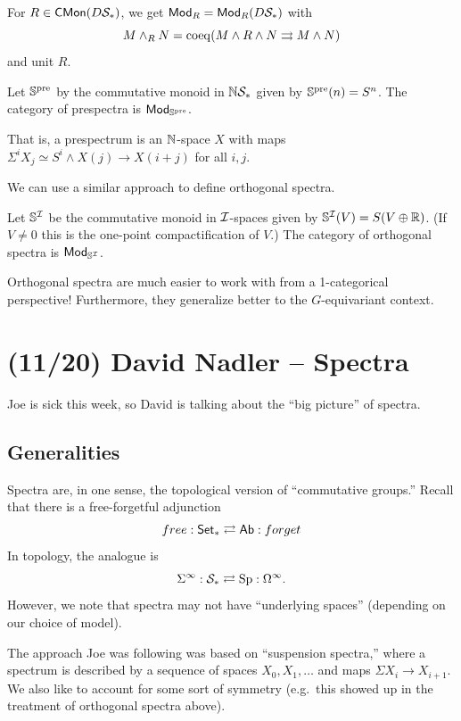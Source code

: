 \documentclass{article}
\begin{document}
For $R \in \mathsf{CMon}(D\mathcal{S}_*)$, we get $\mathsf{Mod}_R = \mathsf{Mod}_R(D\mathcal{S}_*)$ with 
\[
  M \wedge_R N = \operatorname{coeq}(M \wedge R \wedge N \rightrightarrows M \wedge N)
\]
and unit $R$.

\begin{dfn}
  Let $\mathbb{S}^{\mathrm{pre}}$ by the commutative monoid in $\mathbb{N}\mathcal{S}_*$ given by $\mathbb{S}^{\mathrm{pre}}(n) = S^n$.
  The category of prespectra is $\mathsf{Mod}_{\mathbb{S}^{\mathrm{pre}}}$.
\end{dfn}

That is, a prespectrum is an $\mathbb{N}$-space $X$ with maps $\Sigma^i X_j \simeq S^i \wedge X(j) \to X(i+j)$ for all $i, j$.

We can use a similar approach to define orthogonal spectra.

\begin{dfn}
  Let $\mathbb{S}^{\mathcal{I}}$ be the commutative monoid in $\mathcal{I}$-spaces given by $\mathbb{S}^{\mathcal{I}}(V) = S(V \oplus \mathbb{R})$.
  (If $V \neq 0$ this is the one-point compactification of $V$.)
  The category of orthogonal spectra is $\mathsf{Mod}_{\mathbb{S}^{\mathcal{I}}}$.
\end{dfn}

Orthogonal spectra are much easier to work with from a 1-categorical perspective!
Furthermore, they generalize better to the $G$-equivariant context.

\section{(11/20) David Nadler -- Spectra}

Joe is sick this week, so David is talking about the ``big picture'' of spectra.

\subsection{Generalities}

Spectra are, in one sense, the topological version of ``commutative groups.''
Recall that there is a free-forgetful adjunction
\[
  \mathop{free}: \mathsf{Set}_* \rightleftarrows \mathsf{Ab}: \mathop{forget}
\]
In topology, the analogue is 
\[
  \Sigma^\infty: \mathcal{S}_* \rightleftarrows \operatorname{Sp}: \Omega^\infty.
\]
However, we note that spectra may not have ``underlying spaces'' (depending on our choice of model).

The approach Joe was following was based on ``suspension spectra,'' where a spectrum is described by a sequence of spaces $X_0, X_1, \dots$ and maps $\Sigma X_i \to X_{i+1}$.
We also like to account for some sort of symmetry (e.g.\ this showed up in the treatment of orthogonal spectra above).
\end{document}
